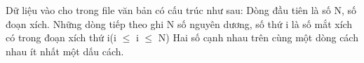 Dữ liệu vào cho trong file văn bản có cấu trúc như sau:  Dòng đầu tiên là số N, số đoạn xích.  Những dòng tiếp theo ghi N số nguyên dương, số thứ i là số mắt xích có trong đoạn xích thứ i(i  $\le$  i  $\le$  N)  Hai số cạnh nhau trên cùng một dòng cách nhau ít nhất một dấu cách.